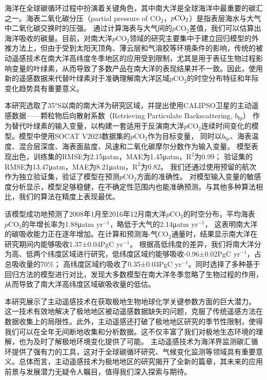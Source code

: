 \cleardoublepage

海洋在全球碳循环过程中扮演着关键角色，其中南大洋是全球海洋中最重要的碳汇之一。海表二氧化碳分压（partial pressure of $\mathrm{CO_2}$，$p\rm CO_2$）是指表层海水与大气中二氧化碳交换时的压强。
通过计算海表与大气间的$p\mathrm{CO_2}$差值，我们可以估算出海洋吸收的碳量。目前，对南大洋$p\mathrm{CO_2}$领域的研究主要集中于建立回归模型的外推方法上，但由于受到太阳天顶角、薄云层和气溶胶等环境条件的影响，传统的被动遥感技术在南大洋高纬度冬季地区的应用受到限制，尤其是用于表征生物过程影响变量的叶绿素，从而导致了多数产品在南大洋的表现结果并不一致。因此，使用新的遥感数据来代替叶绿素对于准确理解南大洋区域$p\mathrm{CO_2}$的时空分布特征和年际变化趋势具有重要意义。

本研究选取了35°S以南的南大洋为研究区域，并提出使用CALIPSO卫星的主动遥感数据——颗粒物后向散射系数（Retrieving Particulate Backscattering, $b_{bp}$）
作为替代叶绿素的输入变量，以构建一套适用于反演南大洋$p\mathrm{CO_2}$连续时间变化的模型。模型中使用SOCAT V2023数据集的$p\mathrm{CO_2}$作为目标变量，
同时以$b_{bp}$、海表温度、混合层深度、海表面盐度、风速和二氧化碳摩尔分数作为输入变量。
模型表现出色，训练集的RMSE为2.15μatm，MAE为1.45μatm，$\mathrm{R^2}$为0.99；
验证集的RMSE为13.47μatm，MAE为8.21μatm，$\mathrm{R^2}$为0.82。
我们还通过使用预留的航次作为独立验证集，验证了模型在预测$p\mathrm{CO_2}$方面的准确性。
对模型输入变量的敏感度分析显示，模型足够稳健，在不确定性范围内也能准确预测。与其他多种算法相比，我们的算法在精度上表现最优。

该模型成功地预测了2008年1月至2016年12月南大洋$p\mathrm{CO_2}$的时空分布，平均海表$p\mathrm{CO_2}$的年增长率为1.88μatm yr$^{-1}$，略低于大气的2.14μatm yr$^{-1}$，
这表明南大洋的碳吸收能力正在逐年增加。在计算和预测海-气$\mathrm{CO_2}$通量时，结果显示南大洋在研究期间内能够吸收1.37±0.04PgC yr$^{-1}$。
根据高低纬度的差异，我们将南大洋分为高、低两个纬度区域进行研究，低纬度区域约能够吸收-0.96±0.02PgC yr$^{-1}$，占总吸收量的70\%；
高纬度区域约吸收了0.35±0.03PgC yr$^{-1}$。同时选择了多种基于回归方法的模型进行对比，发现大多数模型在南大洋冬季忽略了生物过程的作用，从而导致了南大洋高纬度区域碳吸收量的低估。

本研究展示了主动遥感技术在获取极地生物地球化学关键参数方面的巨大潜力。
这一技术有效地解决了极地地区被动遥感数据缺失的问题，克服了传统遥感方法在数据收集上的局限性。此外，主动遥感还打破了极地地区研究的季节性限制，使得我们可以在全年无间断地收集和分析数据。这不仅丰富了我们对极地生态环境的理解，也为及时了解极地环境变化提供了可能。
主动遥感技术为海洋界监测碳汇循环提供了强有力的工具，这对于全球碳循环研究、气候变化监测等领域具有重要意义。总体而言，主动遥感技术为极地地区的研究揭开了全新的篇章，其未来的应用前景与发展潜力无疑令人瞩目，值得我们深入探索与期待。

